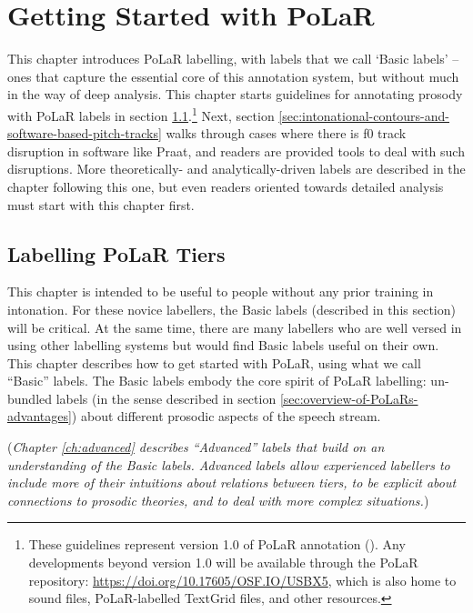 \documentclass[11pt, twoside]{memoir}
\begin{document}
\chapter{Getting Started with PoLaR}\label{ch:basics}

This chapter introduces PoLaR labelling, with labels that we call ‘Basic labels’ – ones that capture the essential core of this annotation system, but without much in the way of deep analysis. This chapter starts guidelines for annotating prosody with PoLaR labels in section  \ref{sec:labelling-polar-tiers}.\footnote{These guidelines represent version 1.0 of PoLaR annotation (\citealt{ahn-21}). Any developments beyond version 1.0 will be available through the PoLaR repository: \href{https://doi.org/10.17605/OSF.IO/USBX5}{https://doi.org/10.17605/OSF.IO/USBX5}, which is also home to sound files, PoLaR-labelled TextGrid files, and other resources.} Next, section \ref{sec:intonational-contours-and-software-based-pitch-tracks} walks through cases where there is f0 track disruption in software like Praat, and readers are provided tools to deal with such disruptions. More theoretically- and analytically-driven labels are described in the chapter following this one, but even readers oriented towards detailed analysis must start with this chapter first.

\section{Labelling PoLaR Tiers}\label{sec:labelling-polar-tiers}

This chapter is intended to be useful to people without any prior training in intonation. For these novice labellers, the Basic labels (described in this section) will be critical. At the same time, there are many labellers who are well versed in using other labelling systems but would find Basic labels useful on their own. This chapter describes how to get started with PoLaR, using what we call “Basic” labels. The Basic labels embody the core spirit of PoLaR labelling: un-bundled labels (in the sense described in section \ref{sec:overview-of-PoLaRs-advantages}) about different prosodic aspects of the speech stream.

(\textit{Chapter \ref{ch:advanced} describes “Advanced” labels that build on an understanding of the Basic labels. Advanced labels allow experienced labellers to include more of their intuitions about relations between tiers, to be explicit about connections to prosodic theories, and to deal with more complex situations.})
\end{document}
